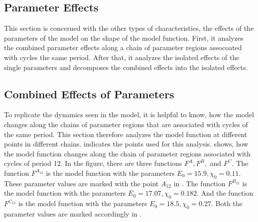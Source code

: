 \subsection{Parameter Effects}
\label{sec:setup.char.paramfx}

This section is concerned with the other types of characteristics, the effects of the parameters of the model on the shape of the model function.
First, it analyzes the combined parameter effects along a chain of parameter regions assocoated with cycles the same period.
After that, it analyzes the isolated effects of the single parameters and decomposes the combined effects into the isolated effects.

\subsection{Combined Effects of Parameters}
\label{sec:setup.char.paramfx.combined}

To replicate the dynamics seen in the model, it is helpful to know, how the model changes along the chains of parameter regions that are associated with cycles of the same period.
This section therefore analyzes the model function at different points in different chains.
 indicates the points used for this analysis.
 shows, how the model function changes along the chain of parameter regions associated with cycles of period 12.
In the figure, there are three functions $F^A, F^B,$ and $F^C$.
The function $F^{A_{12}}$ is the model function with the parameters $E_0 = 15.9, \chi_0 = 0.11$.
These parameter values are marked with the point $A_{12}$ in .
The function $F^{B_{12}}$ is the model function with the parameters $E_0 = 17.07, \chi_0 = 0.182$.
And the function $F^{C_{12}}$ is the model function with the parameters $E_0 = 18.5, \chi_0 = 0.27$.
Both the parameter values are marked accordingly in .

